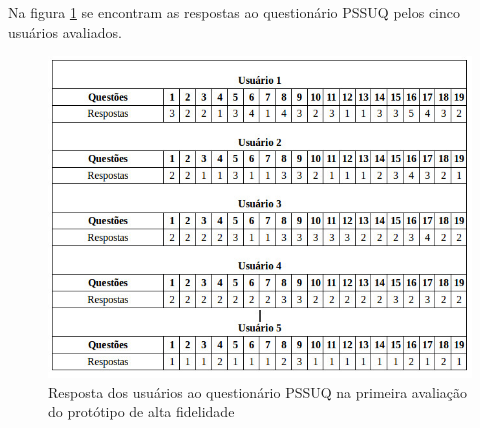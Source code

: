       Na figura \ref{pssuqalta} se encontram as respostas ao questionário PSSUQ pelos cinco usuários avaliados.
      
      \begin{figure}[!htb]
      \centering
      \includegraphics[scale=0.6]{figuras/pssuqalta.jpg}
      \caption{Resposta dos usuários ao questionário PSSUQ na primeira avaliação do protótipo de alta fidelidade}
      \label{pssuqalta}
      \end{figure}
